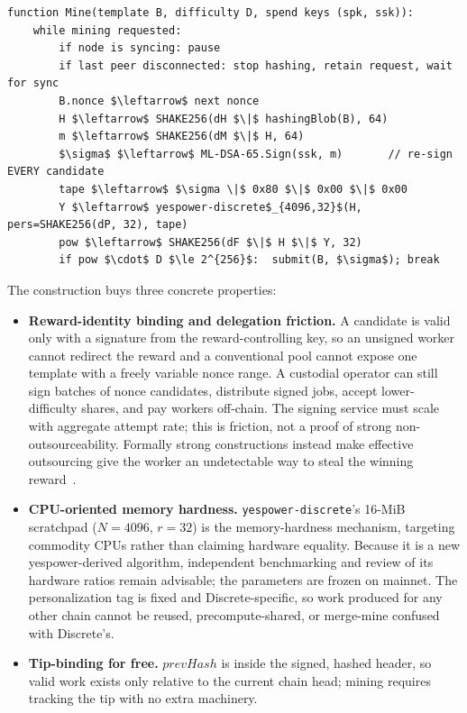 \documentclass[11pt,a4paper]{article}
\newcommand{\code}[1]{\texttt{\small #1}}
\begin{document}
\begin{algorithm}[tbp]
\caption{\textsc{Mine} --- one attempt loop (per thread).}
\label{alg:mine}
\begin{lstlisting}[style=pseudo]
function Mine(template B, difficulty D, spend keys (spk, ssk)):
    while mining requested:
        if node is syncing: pause
        if last peer disconnected: stop hashing, retain request, wait for sync
        B.nonce $\leftarrow$ next nonce
        H $\leftarrow$ SHAKE256(dH $\|$ hashingBlob(B), 64)
        m $\leftarrow$ SHAKE256(dM $\|$ H, 64)
        $\sigma$ $\leftarrow$ ML-DSA-65.Sign(ssk, m)       // re-sign EVERY candidate
        tape $\leftarrow$ $\sigma \|$ 0x80 $\|$ 0x00 $\|$ 0x00
        Y $\leftarrow$ yespower-discrete$_{4096,32}$(H, pers=SHAKE256(dP, 32), tape)
        pow $\leftarrow$ SHAKE256(dF $\|$ H $\|$ Y, 32)
        if pow $\cdot$ D $\le 2^{256}$:  submit(B, $\sigma$); break
\end{lstlisting}
\end{algorithm}

The construction buys three concrete properties:

\begin{itemize}
\item \textbf{Reward-identity binding and delegation friction.} A candidate is
  valid only with a signature from the reward-controlling key, so an unsigned
  worker cannot redirect the reward and a conventional pool cannot expose one
  template with a freely variable nonce range. A custodial operator can still
  sign batches of nonce candidates, distribute signed jobs, accept
  lower-difficulty shares, and pay workers off-chain. The signing service must
  scale with aggregate attempt rate; this is friction, not a proof of strong
  non-outsourceability. Formally strong constructions instead make effective
  outsourcing give the worker an undetectable way to steal the winning
  reward~\cite{nonoutsourceable}.
\item \textbf{CPU-oriented memory hardness.} \code{yespower-discrete}'s 16-MiB
  scratchpad ($N{=}4096$, $r{=}32$) is the memory-hardness mechanism,
  targeting commodity CPUs rather than claiming hardware equality. Because it
  is a new yespower-derived algorithm, independent benchmarking and review of
  its hardware ratios remain advisable; the parameters are frozen on mainnet. The personalization tag is fixed and Discrete-specific, so
  work produced for any other chain cannot be reused, precompute-shared, or
  merge-mine confused with Discrete's.
\item \textbf{Tip-binding for free.} $\mathit{prevHash}$ is inside the signed,
  hashed header, so valid work exists only relative to the current chain
  head; mining requires tracking the tip with no extra machinery.
\end{itemize}
\end{document}
